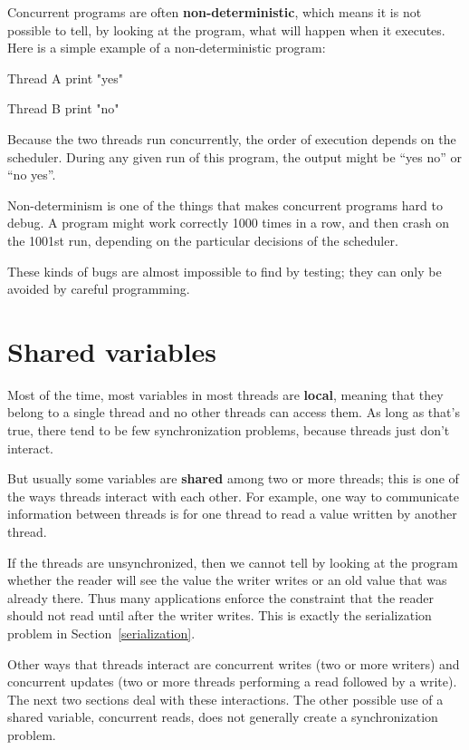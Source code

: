 Concurrent programs are often {\bf non-deterministic}, which means it
is not possible to tell, by looking at the program, what will happen
when it executes.  Here is a simple example of a
non-deterministic program:

\begin{lsthalfbox}[before skip=0.6em]{Thread A}
print "yes"
\end{lsthalfbox}
\begin{lsthalfbox}[after skip=0.6em]{Thread B}
print "no"
\end{lsthalfbox}

Because the two threads run concurrently, the order of
execution depends on the scheduler.  During any given run
of this program, the output might be ``yes no'' or ``no yes''.

Non-determinism is one of the things that makes concurrent
programs hard to debug.  A program might work correctly
1000 times in a row, and then crash on the 1001st run, depending
on the particular decisions of the scheduler.

These kinds of bugs are almost impossible to find by testing;
they can only be avoided by careful programming.


\section {Shared variables}
\label{shared}

Most of the time, most variables in most threads are {\bf local},
meaning that they belong to a single thread and no other threads
can access them.  As long as that's true, there tend to be few
synchronization problems, because threads just don't interact.

But usually some variables are {\bf shared} among two or more
threads; this is one of the ways threads interact with each other.
For example, one way to communicate information between threads is
for one thread to read a value written by another thread.

If the threads are unsynchronized, then we cannot tell by looking at
the program whether the reader will see the value the writer writes
or an old value that was already there.
Thus many applications enforce the constraint that the reader
should not read until after the writer writes.  This is exactly
the serialization problem in Section~\ref{serialization}.

Other ways that threads interact are
concurrent writes (two or more writers) and concurrent updates
(two or more threads performing a read followed by a write).
The next two sections deal with these interactions.  The other
possible use of a shared variable, concurrent
reads, does not generally create a synchronization problem.


